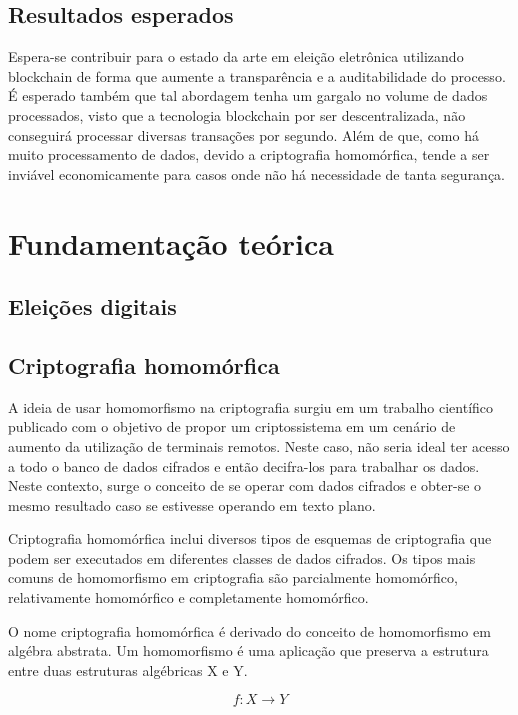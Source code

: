 \documentclass{ufsctex/ufsctex}
\begin{document}
\section{Resultados esperados}

Espera-se contribuir para o estado da arte em eleição eletrônica utilizando
blockchain de forma que aumente a transparência e a auditabilidade do processo.
É esperado também que tal abordagem tenha um gargalo no volume de dados
processados, visto que a tecnologia blockchain por ser descentralizada, não
conseguirá processar diversas transações por segundo. Além de que, como há muito
processamento de dados, devido a criptografia homomórfica, tende a ser inviável
economicamente para casos onde não há necessidade de tanta segurança.

\chapter{Fundamentação teórica}

\section{Eleições digitais}

	\section{Criptografia homomórfica}

A ideia de usar homomorfismo na criptografia surgiu em um trabalho científico
publicado com o objetivo de propor um criptossistema em um cenário de aumento da
utilização de terminais remotos. Neste caso, não seria ideal ter acesso a todo o
banco de dados cifrados e então decifra-los para trabalhar os dados. Neste
contexto, surge o conceito de se operar com dados cifrados e obter-se o mesmo
resultado caso se estivesse operando em texto plano.\cite{homomorphic}

Criptografia homomórfica inclui diversos tipos de esquemas de criptografia que
podem ser executados em diferentes classes de dados cifrados. Os tipos mais
comuns de homomorfismo em criptografia são parcialmente homomórfico,
relativamente homomórfico e completamente homomórfico.\cite{survey-homo}

O nome criptografia homomórfica é derivado do conceito de homomorfismo em
algébra abstrata. Um homomorfismo é uma aplicação que preserva a estrutura entre
duas estruturas algébricas X e Y.

\begin{equation}
{f} : X \longrightarrow Y
\end{equation}
\end{document}
